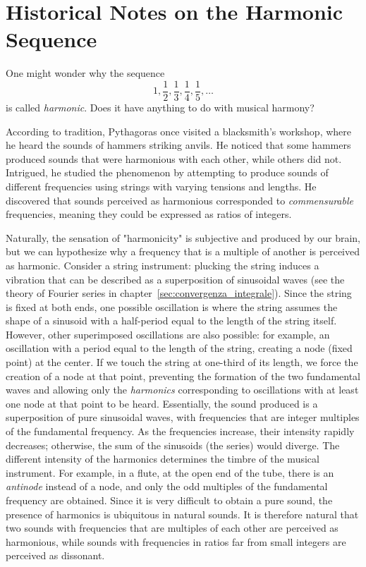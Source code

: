 \section{Historical Notes on the Harmonic Sequence}

One might wonder why the sequence
\[
 1, \frac 1 2, \frac 1 3, \frac 1 4, \frac 1 5, \dots
\]
is called \emph{harmonic}. Does it have anything to do with musical harmony?

According to tradition, Pythagoras once visited a blacksmith's workshop, where
he heard the sounds of hammers striking anvils. He noticed that some hammers
produced sounds that were harmonious with each other, while others did not.
Intrigued, he studied the phenomenon by attempting to produce sounds of
different frequencies using strings with varying tensions and lengths. He
discovered that sounds perceived as harmonious corresponded to
\emph{commensurable} frequencies, meaning they could be expressed as ratios of
integers.

Naturally, the sensation of "harmonicity" is subjective and produced by our
brain, but we can hypothesize why a frequency that is a multiple of another is
perceived as harmonic. Consider a string instrument: plucking the string induces
a vibration that can be described as a superposition of sinusoidal waves (see
the theory of Fourier series in chapter~\ref{sec:convergenza_integrale}). Since
the string is fixed at both ends, one possible oscillation is where the string
assumes the shape of a sinusoid with a half-period equal to the length of the
string itself. However, other superimposed oscillations are also possible: for
example, an oscillation with a period equal to the length of the string,
creating a node (fixed point) at the center. If we touch the string at one-third
of its length, we force the creation of a node at that point, preventing the
formation of the two fundamental waves and allowing only the \emph{harmonics}
corresponding to oscillations with at least one node at that point to be heard.
Essentially, the sound produced is a superposition of pure sinusoidal waves,
with frequencies that are integer multiples of the fundamental frequency. As the
frequencies increase, their intensity rapidly decreases; otherwise, the sum of
the sinusoids (the series) would diverge. The different intensity of the
harmonics determines the timbre of the musical instrument. For example, in a
flute, at the open end of the tube, there is an \emph{antinode} instead of a
node, and only the odd multiples of the fundamental frequency are obtained.
Since it is very difficult to obtain a pure sound, the presence of harmonics is
ubiquitous in natural sounds. It is therefore natural that two sounds with
frequencies that are multiples of each other are perceived as harmonious, while
sounds with frequencies in ratios far from small integers are perceived as
dissonant.

